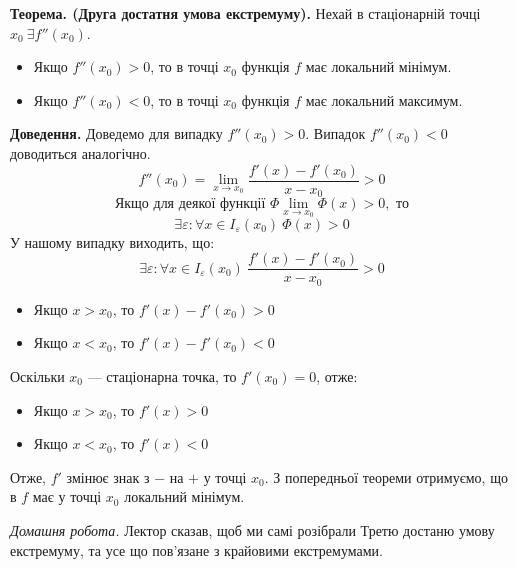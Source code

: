 \documentclass[12pt]{report}
\begin{document}
\vspace{3mm}

\textbf{Теорема. (Друга достатня умова екстремуму).} Нехай в стаціонарній точці $x_0 \ \exists f''(x_0)$.
\begin{itemize}
\item Якщо $f''(x_0) > 0$, то в точці $x_0$ функція $f$ має локальний мінімум.
\item Якщо $f''(x_0) < 0$, то в точці $x_0$ функція $f$ має локальний максимум. 
\end{itemize} 

\textbf{Доведення.} Доведемо для випадку $f''(x_0) > 0$. Випадок $f''(x_0) < 0$ доводиться аналогічно.
$$f''(x_0) = \lim_{x \to x_0}\frac{f'(x) - f'(x_0)}{x - x_0} > 0$$
$$\textrm{Якщо для деякої функції $\Phi$}\lim_{x\to x_0} \Phi (x) > 0, \textrm{ то}$$
$$\exists \varepsilon : \forall x \in I_{\varepsilon}(x_0)\  \Phi(x) > 0$$
У нашому випадку виходить, що:
$$\exists \varepsilon : \forall x \in I_{\varepsilon}(x_0)\ \frac{f'(x) - f'(x_0)}{x - x_0} > 0$$
\begin{itemize}
\item Якщо $x > x_0$, то $f'(x) - f'(x_0) > 0$
\item Якщо $x < x_0$, то $f'(x) - f'(x_0) < 0$
\end{itemize}
Оскільки $x_0$ --- стаціонарна точка, то $f'(x_0) = 0$, отже:
\begin{itemize}
\item Якщо $x > x_0$, то $f'(x) > 0$
\item Якщо $x < x_0$, то $f'(x) < 0$
\end{itemize}
Отже, $f'$ змінює знак з $-$ на $+$ у точці $x_0$. З попередньої теореми отримуємо, що в $f$ має у точці $x_0$ локальний мінімум.

\vspace{3mm}

\textit{Домашня робота.} Лектор сказав, щоб ми самі розібрали Третю достаню умову екстремуму, та усе що пов'язане з крайовими екстремумами.
\end{document}
